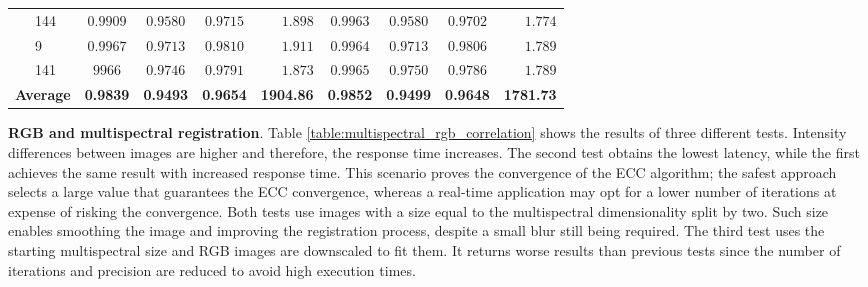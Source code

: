 \begin{table}
\begin{tabular}{ll|cccr|cccr}
        & 144 & $0.9909$ & $0.9580$ & $0.9715$ & $1.898$ & $0.9963$ & $0.9580$ & $0.9702$ & $1.774$\\
        & 9 & $0.9967$ & $0.9713$ & $0.9810$ & $1.911$ & $0.9964$ & $0.9713$ & $0.9806$ & $1.789$\\
        & 141 & $9966$ & $0.9746$ & $0.9791$ & $1.873$ & $0.9965$ & $0.9750$ & $0.9786$ & $1.789$\\
        \cmidrule{1-10}
        \multicolumn{2}{r|}{\textbf{Average}} & \textbf{0.9839} & \textbf{0.9493} & \textbf{0.9654} & \textbf{1904.86} & \textbf{0.9852} & \textbf{0.9499} & \textbf{0.9648} & \textbf{1781.73}\\
        \bottomrule
    \end{tabular}
\end{table}
\renewcommand{\arraystretch}{1}

\textbf{RGB and multispectral registration}. Table \ref{table:multispectral_rgb_correlation} shows the results of three different tests. Intensity differences between images are higher and therefore, the response time increases. The second test obtains the lowest latency, while the first achieves the same result with increased response time. This scenario proves the convergence of the ECC algorithm; the safest approach selects a large value that guarantees the ECC convergence, whereas a real-time application may opt for a lower number of iterations at expense of risking the convergence. Both tests use images with a size equal to the multispectral dimensionality split by two. Such size enables smoothing the image and improving the registration process, despite a small blur still being required. The third test uses the starting multispectral size and RGB images are downscaled to fit them. It returns worse results than previous tests since the number of iterations and precision are reduced to avoid high execution times. 

